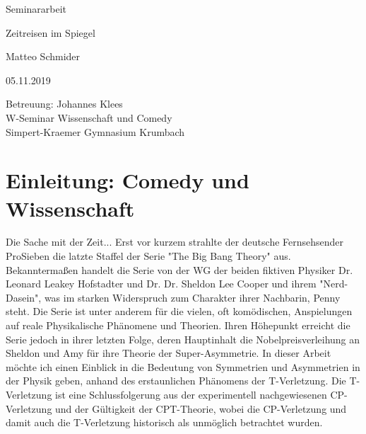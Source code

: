 \documentclass[12pt,a4paper]{scrartcl}
\numberwithin{equation}{section}
\begin{document}
  \pagestyle{empty}

  \begin{titlepage}

    \vspace*{2cm}

 \begin{center} \large

    Seminararbeit
    \vspace*{2cm}

    {\huge Zeitreisen im Spiegel}
    \vspace*{2.5cm}

    Matteo Schmider
    \vspace*{1.5cm}

    05.11.2019
    \vspace*{4.5cm}


    Betreuung: Johannes Klees \\[1cm]
    W-Seminar Wissenschaft und Comedy \\[1cm]
		Simpert-Kraemer Gymnasium Krumbach
  \end{center}
\end{titlepage}



  \tableofcontents

\newpage



  \pagestyle{headings}

  \section{Einleitung: Comedy und Wissenschaft}

Die Sache mit der Zeit...
Erst vor kurzem strahlte der deutsche Fernsehsender ProSieben die latzte Staffel der Serie "The Big Bang Theory" aus. Bekanntermaßen handelt die Serie von der WG der beiden fiktiven Physiker Dr. Leonard Leakey Hofstadter und Dr. Dr. Sheldon Lee Cooper und ihrem "Nerd-Dasein", was im starken Widerspruch zum Charakter ihrer Nachbarin, Penny steht. Die Serie ist unter anderem für die vielen, oft komödischen, Anspielungen auf reale Physikalische Phänomene und Theorien. \iffalse 1-5 Zeilen Nacherzählung der Serie \fi Ihren Höhepunkt erreicht die Serie jedoch in ihrer letzten Folge, deren Hauptinhalt die Nobelpreisverleihung an Sheldon und Amy für ihre Theorie der Super-Asymmetrie. In dieser Arbeit möchte ich einen Einblick in die Bedeutung von Symmetrien und Asymmetrien in der Physik geben, anhand des erstaunlichen Phänomens der T-Verletzung. Die T-Verletzung ist eine Schlussfolgerung aus der experimentell nachgewiesenen CP-Verletzung und der Gültigkeit der CPT-Theorie, wobei die CP-Verletzung und damit auch die T-Verletzung historisch als unmöglich betrachtet wurden. \iffalse Letzte zwei Sätze zu abstrakt, müssen besser zu lockererem Stil der Einleitung passen, Einleitung soll trotzdem noch möglichst genau das Thema vorbereiten \fi
\end{document}
